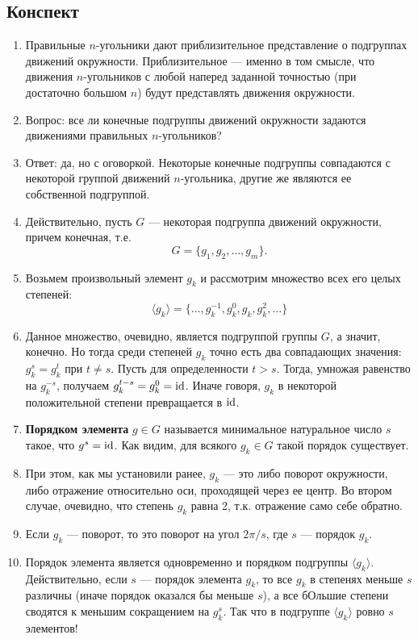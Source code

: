 \subsection{Конспект}
\begin{enumerate}\setlength{\itemsep}{1pt}
\item Правильные $n$-угольники дают приблизительное представление о подгруппах движений окружности. Приблизительное --- именно в том смысле, что движения $n$-угольников с любой наперед заданной точностью (при достаточно большом $n$) будут представлять движения окружности.
\item Вопрос: все ли конечные подгруппы движений окружности задаются движениями правильных $n$-угольников?
\item Ответ: да, но с оговоркой. Некоторые конечные подгруппы совпадаются с некоторой группой движений $n$-угольника, другие же являются ее собственной подгруппой.
\item Действительно, пусть $G$ --- некоторая подгруппа движений окружности, причем конечная, т.е.
$$
G=\{g_1,g_2,\dots,g_m\}.
$$
\item Возьмем произвольный элемент $g_k$ и рассмотрим множество всех его целых степеней:
$$
\langle g_k\rangle=\{\dots,g_k^{-1},g_k^0,g_k,g_k^2,\dots\}
$$
\item Данное множество, очевидно, является подгруппой группы $G$, а значит, конечно. Но тогда среди степеней $g_k$ точно есть два совпадающих значения: $g_k^s=g_k^t$ при $t\ne s$. Пусть для определенности $t>s$. Тогда, умножая равенство на $g_k^{-s}$, получаем $g_k^{t-s}=g_k^0=\mathrm{id}$. Иначе говоря, $g_k$ в некоторой положительной степени превращается в $\mathrm{id}$.
\item \textbf{Порядком элемента} $g\in G$ называется минимальное натуральное число $s$ такое, что $g^s=\mathrm{id}$. Как видим, для всякого $g_k\in G$ такой порядок существует.
\item При этом, как мы установили ранее, $g_k$ --- это либо поворот окружности, либо отражение относительно оси, проходящей через ее центр. Во втором случае, очевидно, что степень $g_k$ равна 2, т.к. отражение само себе обратно.
\item Если $g_k$ --- поворот, то это поворот на угол $2\pi/s$, где $s$ --- порядок $g_k$.
\item Порядок элемента является одновременно и порядком подгруппы $\langle g_k\rangle$. Действительно, если $s$ --- порядок элемента $g_k$, то все $g_k$ в степенях меньше $s$ различны (иначе порядок оказался бы меньше $s$), а все бОльшие степени сводятся к меньшим сокращением на $g_k^s$. Так что в подгруппе $\langle g_k\rangle$ ровно $s$ элементов!

\end{enumerate}
